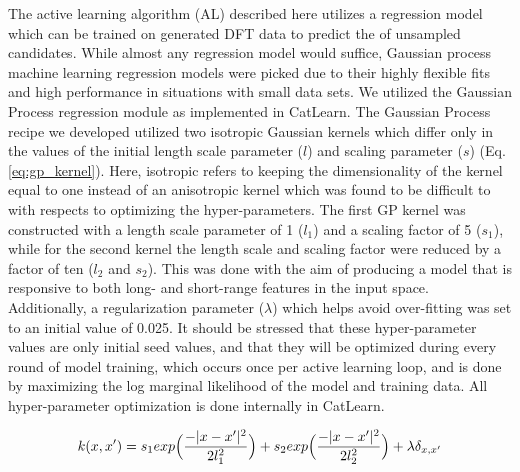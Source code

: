 %
The active learning algorithm (AL) described here utilizes a regression model which can be trained on generated DFT data to predict the \DHf of unsampled candidates.
%
While almost any regression model would suffice, Gaussian process machine learning regression models were picked due to their highly flexible fits and high performance in situations with small data sets.
%
We utilized the Gaussian Process regression module as implemented in CatLearn.\cite{hansen2019atomistic,CatLearn_Repo}
%
The Gaussian Process recipe we developed utilized two isotropic Gaussian kernels which differ only in the values of the initial length scale parameter ($l$) and scaling parameter ($s$) (Eq. \ref{eq:gp_kernel}).
%
Here, isotropic refers to keeping the dimensionality of the kernel equal to one instead of an anisotropic kernel which was found to be difficult to with respects to optimizing the hyper-parameters.
%
The first GP kernel was constructed with a length scale parameter of \num{1} ($l_1$) and a scaling factor of 5 ($s_1$),
while for the second kernel the length scale and scaling factor were reduced by a factor of ten ($l_2$ and $s_2$).
%
This was done with the aim of producing a model that is responsive to both long- and short-range features in the input space.
%
Additionally, a regularization parameter ($\lambda$) which helps avoid over-fitting was set to an initial value of \num{0.025}.
%
It should be stressed that these hyper-parameter values are only initial seed values, and that they will be optimized during every round of model training,
which occurs once per active learning loop,
and is done by maximizing the log marginal likelihood of the model and training data.
%
All hyper-parameter optimization is done internally in CatLearn.


\begin{equation}
    k(x,x') =
    s_1 exp \Bigl ( \frac{-|x-x'|^2}{2l_1^2}\Bigr) +
    s_2 exp\Bigl (\frac{-|x-x'|^2}{2l_2^2}\Bigr) +
    \lambda \delta_{x,x'}
    \label{eq:gp_kernel}
\end{equation}










